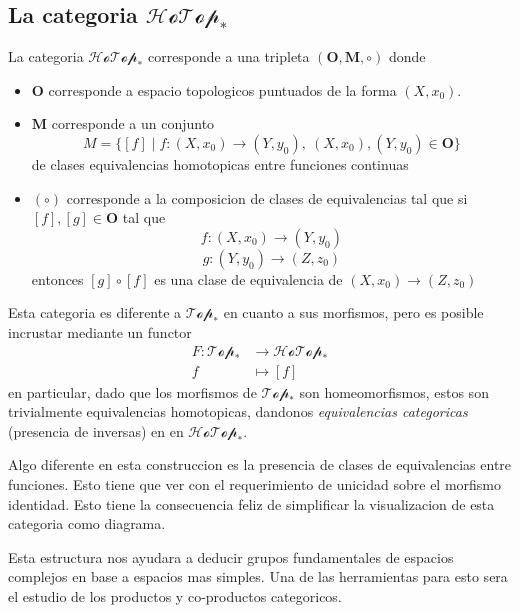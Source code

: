 \subsection{La categoria \(\mathscr{HoTop}_*\)}
\begin{definicion}
  La categoria \(\mathscr{HoTop}_*\) corresponde a una tripleta
  \((\mathbf{O},\mathbf M, \circ)\) donde
  \begin{itemize}
  \item \(\mathbf O\) corresponde a espacio topologicos puntuados de la
    forma \((X, x_0)\).
  \item \(\mathbf M\) corresponde a un conjunto
    \[ M = \{ [f] \mid f : (X,x_0) \to (Y,y_0),\ (X,x_0),(Y,y_0) \in
      \mathbf O \}\]
    de clases equivalencias homotopicas entre funciones continuas
  \item \((\circ)\) corresponde a la composicion de clases de
    equivalencias tal que si \([f] , [g] \in \mathbf O \) tal que
    \[ f : (X,x_0) \to (Y, y_0)\]
    \[ g : (Y, y_0) \to (Z, z_0)\]
    entonces \([g] \circ [f]\) es una clase de equivalencia de \((X,
    x_0) \to (Z, z_0)\)
  \end{itemize}
\end{definicion}
Esta categoria es diferente a \(\mathscr{Top}_*\) en cuanto a sus
morfismos, pero es posible incrustar mediante un functor
\begin{align*}
  F : \mathscr{Top}_* &\to \mathscr{HoTop}_* \\
      f &\mapsto [f]
\end{align*}
en particular, dado que los morfismos de  \(\mathscr{Top}_*\) son
homeomorfismos, estos son trivialmente equivalencias homotopicas,
dandonos \emph{equivalencias categoricas} (presencia de inversas) en
en  \(\mathscr{HoTop}_*\).

Algo diferente en esta construccion es la presencia de clases de
equivalencias entre funciones. Esto tiene que ver con el requerimiento
de unicidad sobre el morfismo identidad. Esto tiene la consecuencia
feliz de simplificar la visualizacion de esta categoria como diagrama.

Esta estructura nos ayudara a deducir grupos fundamentales de espacios
complejos en base a espacios mas simples. Una de las herramientas para
esto sera el estudio de los productos y co-productos categoricos.

